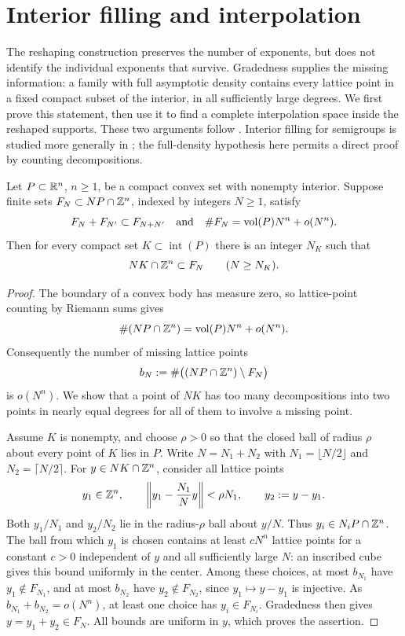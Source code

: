 \section{Interior filling and interpolation}\label{sec:interpolation}

The reshaping construction preserves the number of exponents, but does not
identify the individual exponents that survive.  Gradedness supplies the missing
information: a family with full asymptotic density contains every lattice point
in a fixed compact subset of the interior, in all sufficiently large degrees.
We first prove this statement, then use it to find a complete interpolation
space inside the reshaped supports.  These two arguments follow
\cite[Lemmas~5.1 and~5.2]{OpenAI2026Higher}.  Interior filling for semigroups
is studied more generally in \cite[Theorem~1.6]{KavehKhovanskii2012}; the
full-density hypothesis here permits a direct proof by counting decompositions.

\begin{lemma}\label{lem:interior-filling}
Let $P\subset\mathbb R^n$, $n\ge1$, be a compact convex set with nonempty interior.
Suppose finite sets $F_N\subset NP\cap\mathbb Z^n$, indexed by integers $N\ge1$,
satisfy
\[
 F_N+F_{N'}\subset F_{N+N'}
 \quad\text{and}\quad
 \#F_N=\operatorname{vol}(P)N^n+o(N^n).
\]
Then for every compact set $K\subset\operatorname{int}(P)$ there is an integer
$N_K$ such that
\[
 NK\cap\mathbb Z^n\subset F_N\qquad(N\ge N_K).
\]
\end{lemma}

\begin{proof}
The boundary of a convex body has measure zero, so lattice-point counting by
Riemann sums gives
\[
 \#(NP\cap\mathbb Z^n)=\operatorname{vol}(P)N^n+o(N^n).
\]
Consequently the number of missing lattice points
\[
 b_N:=\#\bigl((NP\cap\mathbb Z^n)\setminus F_N\bigr)
\]
is $o(N^n)$.  We show that a point of $NK$ has too many decompositions into two
points in nearly equal degrees for all of them to involve a missing point.

Assume $K$ is nonempty, and choose $\rho>0$ so that the closed ball of radius
$\rho$ about every point of $K$ lies in $P$.  Write
$N=N_1+N_2$ with $N_1=\lfloor N/2\rfloor$ and
$N_2=\lceil N/2\rceil$.  For $y\in NK\cap\mathbb Z^n$, consider all lattice points
\[
 y_1\in\mathbb Z^n,
 \qquad
 \left\|y_1-\frac{N_1}{N}y\right\|<\rho N_1,
 \qquad y_2:=y-y_1.
\]
Both $y_1/N_1$ and $y_2/N_2$ lie in the radius-$\rho$ ball about $y/N$.
Thus $y_i\in N_iP\cap\mathbb Z^n$.  The ball from which $y_1$ is chosen contains
at least $cN^n$ lattice points for a constant $c>0$ independent of $y$ and
all sufficiently large $N$: an inscribed cube gives this bound uniformly in
the center.  Among these choices, at most $b_{N_1}$ have $y_1\notin F_{N_1}$,
and at most $b_{N_2}$ have $y_2\notin F_{N_2}$, since $y_1\mapsto y-y_1$ is
injective.  As $b_{N_1}+b_{N_2}=o(N^n)$, at least one choice has
$y_i\in F_{N_i}$.  Gradedness then gives $y=y_1+y_2\in F_N$.
All bounds are uniform in $y$, which proves the assertion.
\end{proof}

